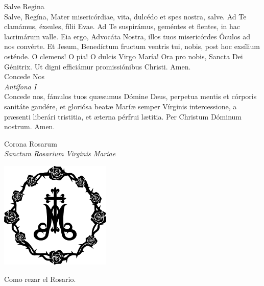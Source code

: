 \documentclass[letterpaper, landscape, 10pt, twocolumn]{article}
\begin{document}
  \Large {\color{red} Salve Regina}\\
  \normalsize {\color{red} S}alve, Regína, Mater misericórdiae, vita, dulcédo et spes nostra, salve. Ad Te clamámus, éxsules, fílii Evae. Ad Te suspirámus, geméntes et flentes, in hac lacrimárum valle. Eia ergo, Advocáta Nostra, illos tuos misericórdes Óculos ad nos convérte. Et Jesum, Benedíctum fructum ventris tui, nobis, post hoc exsílium osténde. O clemens! O pia! O dulcis Virgo María! {\color{red} O}ra pro nobis, Sancta Dei Génitrix. {\color{red} U}t digni efficiámur promissiónibus Christi. {\color{red} A}men.\\

  \Large {\color{red} Concede Nos}\\
  \normalsize {\color{red} \textit{Antífona I}}\\
  {\color{red} C}oncede nos, fámulos tuos quæsumus Dómine Deus, perpetua mentis et córporis sanitáte gaudére, et gloriósa beatæ Maríæ semper Vírginis intercessione, a præsenti liberári tristitia, et æterna pérfrui lætitia. Per Christum Dóminum nostrum. {\color{red} A}men.\\
  \vfill

  \begin{center}
    \Huge Corona Rosarum\\
    \large {\color{red} \textit{Sanctum Rosarium Virginis Mariae}}

    \vspace{1cm}
    \includegraphics{rosa2}
    \vspace{1cm}

    \Large Como rezar el Rosario.
  \end{center}
\end{document}
